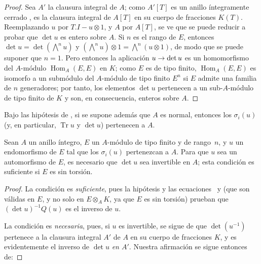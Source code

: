 \documentclass[oneside,10pt]{amsart}
\makeatletter
\newcommand{\ega@arrow}[2]{\mathchoice{#1}{#2}{#2}{#2}}
\renewcommand{\to}{\ega@arrow{\longrightarrow}{\rightarrow}}
\newcommand{\oldpage}[2][]{\marginnote{\normalfont\footnotesize\textbf{#1}~|~#2}\ignorespaces}
\let\EGAOriginalLabel\label
\renewcommand{\label}[1]{\phantomsection\EGAOriginalLabel{#1}}
\makeatother
\begin{document}
\begin{proof}
Sea $A'$ la clausura integral de $A$;
como $A'[T]$ es un anillo íntegramente cerrado \cite[p.~99]{II-24}, es la clausura integral de $A[T]$ en su cuerpo de fracciones $K(T)$.
Reemplazando $u$ por $T.I-u\otimes1$, y $A$ por $A[T]$, se ve que se puede reducir a probar que $\det u$ es entero sobre $A$.
Si $n$ es el rango de $E$, entonces $\det u=\det(\bigwedge^n u)$ y $(\bigwedge^n u)\otimes1=\bigwedge^n(u\otimes1)$, de modo que se puede suponer que $n=1$.
Pero entonces la aplicación $u\to\det u$ es un homomorfismo del $A$-módulo $\operatorname{Hom}_A(E,E)$ en $K$;
como $E$ es de tipo finito, $\operatorname{Hom}_A(E,E)$ es isomorfo a un submódulo del $A$-módulo de tipo finito $E^n$ si $E$ admite una familia de $n$ generadores; por tanto, los elementos $\det u$ pertenecen a un sub-$A$-módulo de tipo finito de $K$ y son, en consecuencia, enteros sobre $A$.
\end{proof}

\oldpage[II]{122}
\begin{corollary}[6.4.4]
\label{II.6.4.4-fr}
Bajo las hipótesis de , si se supone además que $A$ es normal, entonces los $\sigma_i(u)$ (y, en particular, $\operatorname{Tr}u$ y $\det u$) pertenecen a $A$.
\end{corollary}

\begin{proposition}[6.4.5]
\label{II.6.4.5-fr}
Sean $A$ un anillo íntegro, $E$ un $A$-módulo de tipo finito y de rango~$n$, y $u$ un endomorfismo de $E$ tal que los $\sigma_i(u)$ pertenezcan a $A$.
Para que $u$ sea un automorfismo de $E$, es necesario que $\det u$ sea invertible en $A$;
esta condición es suficiente si $E$ es sin torsión.
\end{proposition}

\begin{proof}
La condición es \emph{suficiente}, pues la hipótesis y las ecuaciones~ y  (que son válidas en $E$, y no solo en $E\otimes_AK$, ya que $E$ es sin torsión) prueban que $(\det u)^{-1}Q(u)$ es el inverso de $u$.

La condición es \emph{necesaria}, pues, si $u$ es invertible, se sigue de  que $\det(u^{-1})$ pertenece a la clausura integral $A'$ de $A$ en su cuerpo de fracciones $K$, y es evidentemente el inverso de $\det u$ \emph{en $A'$}.
Nuestra afirmación se sigue entonces de:
\end{proof}
\end{document}
